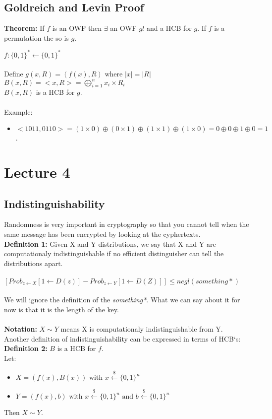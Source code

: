 \documentclass[oneside,a4paper,12pt]{book}
\begin{document}
\section{Goldreich and Levin Proof}

\textbf{Theorem:} If $f$ is an OWF then $\exists$ an OWF $gl$ and a HCB for $g$. If $f$ is a permutation the so is $g$.

$f:\{0,1\}^*\leftarrow\{0,1\}^*$\\\\
Define $g(x,R) = (f(x), R) \text{ where } |x| =|R|$\\
$B(x,R)= <x,R> =\bigoplus^n_{i=1}x_i \times R_i$\\
$B(x,R)$ is a HCB for $g$.\\\\
Example:
\begin{itemize}
\item $<1011,0110> = (1\times0)\oplus(0\times1)\oplus(1\times1)\oplus(1\times0)=0\oplus0\oplus1\oplus0=1$.
\end{itemize}
\chapter{Lecture 4}%
\section{Indistinguishability}
Randomness is very important in cryptography so that you cannot tell when the same message has been encrypted by looking at the cyphertexts.\\

\textbf{Definition 1:} Given X and Y distributions, we say that X and Y are computationaly indistinguishable if no efficient distinguisher can tell the distributions apart.\\\\
$[Prob_{z\gets X}[1\gets D(z)]-Prob_{z\gets Y}[1\gets D(Z)]]\leq negl(something*)$\\\\
We will ignore the definition of the \textit{something*}. What we can say about it for now is that it is the length of the key.\\\\
\textbf{Notation:} $X\sim Y$ means X is computationaly indistinguishable from Y.\\

Another definition of indistinguishability can be expressed in terms of HCB`s:\\
\textbf{Definition 2:} $B$ is a HCB for $f$.\\
Let:
\begin{itemize}
\item $X=(f(x), B(x)) \text{ with } x\xleftarrow{\$}\{0,1\}^n$
\item $Y=(f(x), b) \text{ with } x\xleftarrow{\$}\{0,1\}^n \text{ and } b\xleftarrow{\$}\{0,1\}^n$
\end{itemize}
Then $X\sim Y$.
\end{document}
